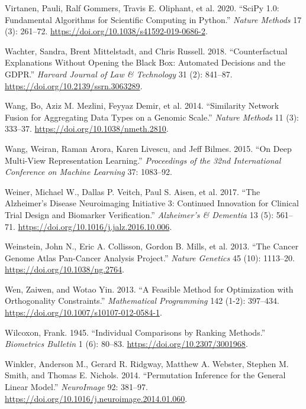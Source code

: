 \documentclass[
  10pt,
  letterpaper,
]{report}
\newlength{\cslhangindent}
\newenvironment{CSLReferences}[2] %
 {\begin{list}{}{%
  \setlength{\itemindent}{0pt}
  \setlength{\leftmargin}{0pt}
  \setlength{\parsep}{0pt}
  \ifodd #1
   \setlength{\leftmargin}{\cslhangindent}
   \setlength{\itemindent}{-1\cslhangindent}
  \fi
  \setlength{\itemsep}{#2\baselineskip}}}
 {\end{list}}
\begin{document}
\begin{CSLReferences}{1}{1}
{Virtanen, Pauli, Ralf Gommers, Travis E. Oliphant, et al.} 2020.
{``{SciPy} 1.0: Fundamental Algorithms for Scientific Computing in
{Python}.''} \emph{Nature Methods} 17 (3): 261--72.
\url{https://doi.org/10.1038/s41592-019-0686-2}.

Wachter, Sandra, Brent Mittelstadt, and Chris Russell. 2018.
{``Counterfactual Explanations Without Opening the Black Box: Automated
Decisions and the {GDPR}.''} \emph{Harvard Journal of Law \& Technology}
31 (2): 841--87. \url{https://doi.org/10.2139/ssrn.3063289}.

Wang, Bo, Aziz M. Mezlini, Feyyaz Demir, et al. 2014. {``Similarity
Network Fusion for Aggregating Data Types on a Genomic Scale.''}
\emph{Nature Methods} 11 (3): 333--37.
\url{https://doi.org/10.1038/nmeth.2810}.

Wang, Weiran, Raman Arora, Karen Livescu, and Jeff Bilmes. 2015. {``On
Deep Multi-View Representation Learning.''} \emph{Proceedings of the
32nd International Conference on Machine Learning} 37: 1083--92.

{Weiner, Michael W., Dallas P. Veitch, Paul S. Aisen, et al.} 2017.
{``The {Alzheimer's Disease Neuroimaging Initiative} 3: Continued
Innovation for Clinical Trial Design and Biomarker Verification.''}
\emph{Alzheimer's \& Dementia} 13 (5): 561--71.
\url{https://doi.org/10.1016/j.jalz.2016.10.006}.

Weinstein, John N., Eric A. Collisson, Gordon B. Mills, et al. 2013.
{``The {Cancer Genome Atlas Pan-Cancer} Analysis Project.''}
\emph{Nature Genetics} 45 (10): 1113--20.
\url{https://doi.org/10.1038/ng.2764}.

Wen, Zaiwen, and Wotao Yin. 2013. {``A Feasible Method for Optimization
with Orthogonality Constraints.''} \emph{Mathematical Programming} 142
(1-2): 397--434. \url{https://doi.org/10.1007/s10107-012-0584-1}.

Wilcoxon, Frank. 1945. {``Individual Comparisons by Ranking Methods.''}
\emph{Biometrics Bulletin} 1 (6): 80--83.
\url{https://doi.org/10.2307/3001968}.

Winkler, Anderson M., Gerard R. Ridgway, Matthew A. Webster, Stephen M.
Smith, and Thomas E. Nichols. 2014. {``Permutation Inference for the
General Linear Model.''} \emph{NeuroImage} 92: 381--97.
\url{https://doi.org/10.1016/j.neuroimage.2014.01.060}.


\end{CSLReferences}
\end{document}
